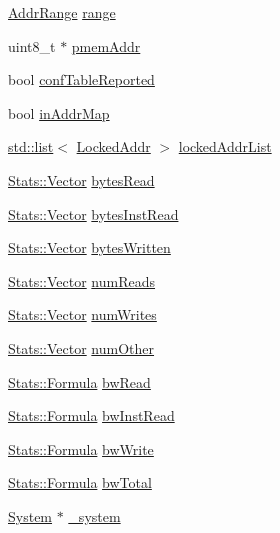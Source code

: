 \begin{DoxyCompactItemize}
\item 
\hyperlink{classAddrRange}{AddrRange} \hyperlink{classAbstractMemory_a194876a072a83a9fd59dde82e5213f0d}{range}
\item 
uint8\_\-t $\ast$ \hyperlink{classAbstractMemory_a9f8ed24d8442f662831d51922e7fddd2}{pmemAddr}
\item 
bool \hyperlink{classAbstractMemory_adee792d6bf567779ea9c16640af42784}{confTableReported}
\item 
bool \hyperlink{classAbstractMemory_a7302c053380cdccd0bdf63b25f73cbc5}{inAddrMap}
\item 
\hyperlink{classstd_1_1list}{std::list}$<$ \hyperlink{classLockedAddr}{LockedAddr} $>$ \hyperlink{classAbstractMemory_af35631da2ae35079d76e07c46fe78565}{lockedAddrList}
\item 
\hyperlink{classStats_1_1Vector}{Stats::Vector} \hyperlink{classAbstractMemory_aa36971a2ea8ddd9d82832059cbc1b21f}{bytesRead}
\item 
\hyperlink{classStats_1_1Vector}{Stats::Vector} \hyperlink{classAbstractMemory_a5e52eb4a824c1fb452d77dae86dfa970}{bytesInstRead}
\item 
\hyperlink{classStats_1_1Vector}{Stats::Vector} \hyperlink{classAbstractMemory_ab89ec4a4876671ad5186d0e9c0e674ed}{bytesWritten}
\item 
\hyperlink{classStats_1_1Vector}{Stats::Vector} \hyperlink{classAbstractMemory_a27f442fbcb7bc7661412cc1d96ca51e7}{numReads}
\item 
\hyperlink{classStats_1_1Vector}{Stats::Vector} \hyperlink{classAbstractMemory_acfd6a97aa6c2de05417a7403369e71c2}{numWrites}
\item 
\hyperlink{classStats_1_1Vector}{Stats::Vector} \hyperlink{classAbstractMemory_a52bafd014022e75d82b4e0de25d3faf7}{numOther}
\item 
\hyperlink{classStats_1_1Formula}{Stats::Formula} \hyperlink{classAbstractMemory_a14a0a95f3cd104b70d5b5c19c3ee8099}{bwRead}
\item 
\hyperlink{classStats_1_1Formula}{Stats::Formula} \hyperlink{classAbstractMemory_a00512ebb77886b71a63bd1595828d592}{bwInstRead}
\item 
\hyperlink{classStats_1_1Formula}{Stats::Formula} \hyperlink{classAbstractMemory_a8077d31db9c4f4f9e78888def6de8430}{bwWrite}
\item 
\hyperlink{classStats_1_1Formula}{Stats::Formula} \hyperlink{classAbstractMemory_a678ff8c93c78d0be1884742ef8aa41e8}{bwTotal}
\item 
\hyperlink{classSystem}{System} $\ast$ \hyperlink{classAbstractMemory_a1da55f4024bf8a9b14b64054841148b8}{\_\-system}
\end{DoxyCompactItemize}
